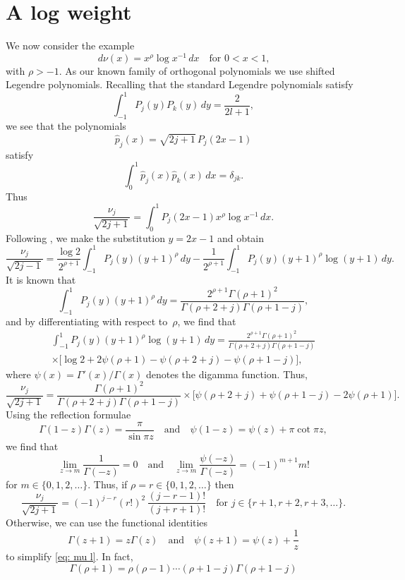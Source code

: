 \documentclass[12pt,a4paper]{article}
\begin{document}
\section{A log weight}
We now consider the example
\[
d\nu(x)=x^\rho\log x^{-1}\,dx\quad\text{for $0<x<1$,}
\]
with $\rho>-1$.  As our known family of orthogonal polynomials we 
use shifted Legendre polynomials.  Recalling that the standard 
Legendre polynomials satisfy
\[
\int_{-1}^1P_j(y)P_k(y)\,dy=\frac{2}{2l+1},
\]
we see that the polynomials
\[
\hat p_j(x)=\sqrt{2j+1}\,P_j(2x-1)
\]
satisfy
\[
\int_0^1\hat p_j(x)\hat p_k(x)\,dx=\delta_{jk}.
\]
Thus
\[
\frac{\nu_j}{\sqrt{2j+1}}=\int_0^1 P_j(2x-1)x^\rho\log x^{-1}\,dx.
\]
Following \cite{Gautschi1979}, we make the substitution $y=2x-1$
and obtain
\[
\frac{\nu_j}{\sqrt{2j-1}}=\frac{\log 2}{2^{\rho+1}}\int_{-1}^1
	P_j(y)(y+1)^\rho\,dy
	-\frac{1}{2^{\rho+1}}\int_{-1}^1 P_j(y)(y+1)^\rho\log(y+1)\,dy.
\]
It is known \cite{Gautschi1979} that
\[
\int_{-1}^1 P_j(y)(y+1)^\rho\,dy
	=\frac{2^{\rho+1}\Gamma(\rho+1)^2}%
{\Gamma(\rho+2+j)\Gamma(\rho+1-j)},
\]
and by differentiating with respect to~$\rho$, we find that
\begin{multline*}
\int_{-1}^1 P_j(y)(y+1)^\rho\log(y+1)\,dy
	=\frac{2^{\rho+1}\Gamma(\rho+1)^2}%
{\Gamma(\rho+2+j)\Gamma(\rho+1-j)}\\
	\times\bigl[\log2+2\psi(\rho+1)-\psi(\rho+2+j)-\psi(\rho+1-j)
	\bigr],
\end{multline*}
where $\psi(x)=\Gamma'(x)/\Gamma(x)$ denotes the digamma function.
Thus,
\begin{equation}\label{eq: mu l}
\frac{\nu_j}{\sqrt{2j+1}}
	=\frac{\Gamma(\rho+1)^2}{\Gamma(\rho+2+j)\Gamma(\rho+1-j)}
	\times\bigl[\psi(\rho+2+j)+\psi(\rho+1-j)-2\psi(\rho+1)\bigr].
\end{equation}
Using the reflection formulae
\[
\Gamma(1-z)\Gamma(z)=\frac{\pi}{\sin\pi z}
\quad\text{and}\quad
\psi(1-z)=\psi(z)+\pi\cot\pi z,
\]
we find that
\[
\lim_{z\to m}\frac{1}{\Gamma(-z)}=0
\quad\text{and}\quad
\lim_{z\to m}\frac{\psi(-z)}{\Gamma(-z)}=(-1)^{m+1}m!
\]
for $m\in\{0,1,2,\dots\}$.  Thus, if $\rho=r\in\{0,1,2,\dots\}$
then
\begin{equation}\label{eq: moment rho r}
\frac{\nu_j}{\sqrt{2j+1}}=(-1)^{j-r}(r!)^2\,\frac{(j-r-1)!}{(j+r+1)!}
	\quad\text{for $j\in\{r+1, r+2, r+3, \dots\}$.}
\end{equation}
Otherwise, we can use the functional identities
\[
\Gamma(z+1)=z\Gamma(z)\quad\text{and}\quad
\psi(z+1)=\psi(z)+\frac{1}{z}
\]
to simplify \eqref{eq: mu l}.  In fact,
\[
\Gamma(\rho+1)=\rho(\rho-1)\cdots(\rho+1-j)\Gamma(\rho+1-j)
\]
\end{document}
